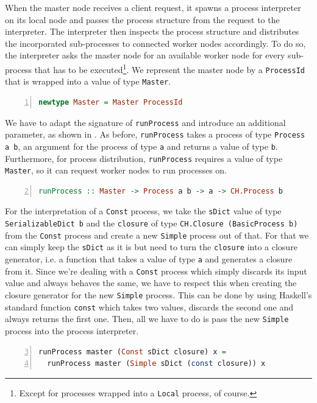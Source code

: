 When the master node receives a client request, it spawns a process interpreter on its local node and passes the process structure from the request to the interpreter. The interpreter then inspects the process structure and distributes the incorporated sub-processes to connected worker nodes accordingly. To do so, the interpreter asks the master node for an available worker node for every sub-process that has to be executed\footnote{Except for processes wrapped into a \texttt{Local} process, of course.}. We represent the master node by a \texttt{ProcessId} that is wrapped into a value of type \texttt{Master}.
\begin{lstlisting}[language=Haskell,caption=Data type for the address of a master node.,numbers=left,frame=bt]
newtype Master = Master ProcessId
\end{lstlisting}

We have to adapt the signature of \texttt{runProcess} and introduce an additional parameter, as shown in . As before, \texttt{runProcess} takes a process of type \texttt{Process a b}, an argument for the process of type \texttt{a} and returns a value of type \texttt{b}. Furthermore, for process distribution, \texttt{runProcess} requires a value of type \texttt{Master}, so it can request worker nodes to run processes on.
\begin{lstlisting}[language=Haskell,caption=Signature of the process interpreter.,label=lst:interpreter_signature,numbers=left,frame=bt,firstnumber=2]
runProcess :: Master -> Process a b -> a -> CH.Process b
\end{lstlisting}

For the interpretation of a \texttt{Const} process, we take the \texttt{sDict} value of type \texttt{SerializableDict b} and the \texttt{closure} of type \texttt{CH.Closure (BasicProcess b)} from the \texttt{Const} process and create a new \texttt{Simple} process out of that. For that we can simply keep the \texttt{sDict} as it is but need to turn the \texttt{closure} into a closure generator, i.e. a function that takes a value of type \texttt{a} and generates a closure from it. Since we're dealing with a \texttt{Const} process which simply discards its input value and always behaves the same, we have to respect this when creating the closure generator for the new \texttt{Simple} process. This can be done by using Haskell's standard function \texttt{const} which takes two values, discards the second one and always returns the first one. Then, all we have to do is pass the new \texttt{Simple} process into the process interpreter.
\begin{lstlisting}[language=Haskell,caption=Implementation of the interpreter of \texttt{Const} processes.,label=lst:runprocess_const,numbers=left,frame=bt,firstnumber=3]
runProcess master (Const sDict closure) x =
  runProcess master (Simple sDict (const closure)) x
\end{lstlisting}


